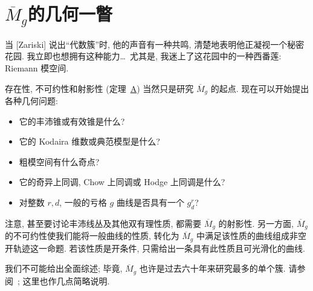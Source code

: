 \section{\texorpdfstring{$\overline M_g$}{稳定曲线粗模空间}的几何一瞥}\label{src:6.10}
\begin{epigraph}
当 [Zariski] 说出``代数簇''时, 他的声音有一种共鸣, 清楚地表明他正凝视一个秘密花园. 我立即也想拥有这种能力\ldots\ 尤其是, 我迷上了这花园中的一种西番莲: Riemann 模空间.
\end{epigraph}
存在性, 不可约性和射影性 (定理~\hyperref[thm:A]{A}) 当然只是研究 $\overline M_g$ 的起点. 现在可以开始提出各种几何问题:
\begin{itemize}
\item 它的丰沛锥或有效锥是什么?
\item 它的 Kodaira 维数或典范模型是什么?
\item 粗模空间有什么奇点?
\item 它的奇异上同调, Chow 上同调或 Hodge 上同调是什么?
\item 对整数 $r,\allowbreak d$, 一般的亏格 $g$ 曲线是否具有一个 $g_d^r$?
\end{itemize}
注意, 甚至要讨论丰沛线丛及其他双有理性质, 都需要 $\overline M_g$ 的射影性. 另一方面, $\overline M_g$ 的不可约性使我们能将一般曲线的性质, 转化为 $\overline M_g$ 中满足该性质的曲线组成非空开轨迹这一命题. 若该性质是开条件, 只需给出一条具有此性质且可光滑化的曲线.

我们不可能给出全面综述; 毕竟, $\overline M_g$ 也许是过去六十年来研究最多的单个簇. 请参阅~\cite{Mum83,ACGH85,HM98,ACG11,FM13}; 这里也作几点简略说明.

